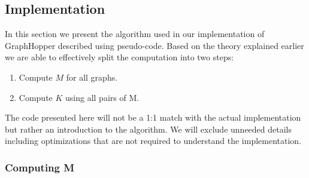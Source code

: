\documentclass{article}
\begin{document}
\subsection{Implementation}
In this section we present the algorithm used in our implementation of GraphHopper described using pseudo-code. Based on the theory explained earlier we are able to effectively split the computation into two steps:
\begin{enumerate}
	\item Compute $M$ for all graphs.
	\item Compute $K$ using all pairs of M.
\end{enumerate}
The code presented here will not be a 1:1 match with the actual implementation but rather an introduction to the algorithm. We will exclude unneeded details including optimizations that are not required to understand the implementation.

\subsubsection{Computing M}
\end{document}
